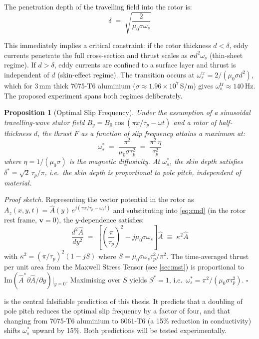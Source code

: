 \documentclass[12pt,letterpaper]{article}
\newtheorem{proposition}[theorem]{Proposition}
\begin{document}
The penetration depth of the travelling field into the rotor is:
\begin{equation}
  \delta \;=\; \sqrt{\frac{2}{\mu_0\sigma\omega_s}}
  \label{eq:skindepth}
\end{equation}

This immediately implies a critical constraint: if the rotor thickness $d < \delta$, eddy
currents penetrate the full cross-section and thrust scales as $\sigma d^2 \omega_s$
(thin-sheet regime). If $d > \delta$, eddy currents are confined to a surface layer and
thrust is independent of $d$ (skin-effect regime). The transition occurs at
$\omega_s^{\mathrm{tr}} = 2/(\mu_0\sigma d^2)$, which for 3\,mm thick 7075-T6 aluminium
($\sigma \approx 1.96 \times 10^7$\,S/m) gives $\omega_s^{\mathrm{tr}} \approx 140$\,Hz.
The proposed experiment spans both regimes deliberately.

\begin{proposition}[Optimal Slip Frequency]
\label{prop:opt_slip}
Under the assumption of a sinusoidal travelling-wave stator field
$B_y = B_0 \cos(\pi x/\tau_p - \omega t)$ and a rotor of half-thickness $d$,
the thrust $F$ as a function of slip frequency attains a maximum at:
\begin{equation}
  \omega_s^* \;=\; \frac{\pi^2}{\mu_0\sigma\tau_p^2}
  \;=\; \frac{\pi^2\,\eta}{\tau_p^2}
  \label{eq:opt_slip}
\end{equation}
where $\eta = 1/(\mu_0\sigma)$ is the magnetic diffusivity. At $\omega_s^*$,
the skin depth satisfies $\delta^* = \sqrt{2}\,\tau_p/\pi$, i.e.\ the skin depth
is proportional to pole pitch, independent of material.
\end{proposition}

\textit{Proof sketch.} Representing the vector potential in the rotor as
$A_z(x,y,t) = \hat{A}(y)\,e^{j(\pi x/\tau_p - \omega_s t)}$ and substituting into
\cref{eq:cmd} (in the rotor rest frame, $\mathbf{v} = 0$), the $y$-dependence satisfies:
\[
  \frac{d^2\hat{A}}{dy^2} \;=\; \left[\left(\frac{\pi}{\tau_p}\right)^2
  - j\mu_0\sigma\omega_s\right]\hat{A} \;\equiv\; \kappa^2\hat{A}
\]
with $\kappa^2 = (\pi/\tau_p)^2(1 - jS)$ where $S = \mu_0\sigma\omega_s\tau_p^2/\pi^2$.
The time-averaged thrust per unit area from the Maxwell Stress Tensor (see \cref{sec:mst})
is proportional to $\mathrm{Im}(\hat{A}^*\partial\hat{A}/\partial y)|_{y=0}$. Maximising
over $S$ yields $S^* = 1$, i.e.\ $\omega_s^* = \pi^2/(\mu_0\sigma\tau_p^2)$. \hfill$\square$

 is the central falsifiable prediction of this thesis. It predicts that
a doubling of pole pitch reduces the optimal slip frequency by a factor of four,
and that changing from 7075-T6 aluminium to 6061-T6 (a 15\% reduction in conductivity)
shifts $\omega_s^*$ upward by 15\%. Both predictions will be tested experimentally.
\end{document}
